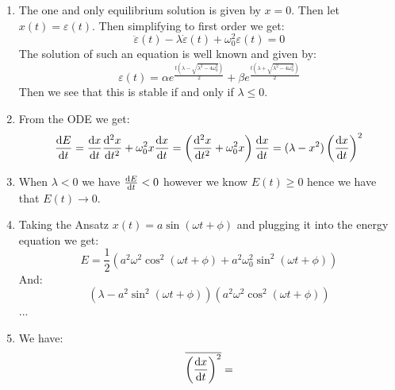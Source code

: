 \documentclass[10pt,a4paper]{book}
\begin{document}
\begin{enumerate}

\item The one and only equilibrium solution is given by $x = 0$. Then let $x(t) = \varepsilon(t)$. Then simplifying to first order we get:
\[
\ddot{\varepsilon}(t) - \lambda \dot{\varepsilon}(t) + \omega_0^2 \varepsilon(t) = 0 
\]
The solution of such an equation is well known and given by:
\[
\varepsilon(t) = \alpha e^{\frac{t(\lambda - \sqrt{\lambda^2 - 4 \omega_0^2})}{2}} + \beta e^{\frac{t(\lambda + \sqrt{\lambda^2 - 4 \omega_0^2})}{2}}
\]
Then we see that this is stable if and only if $\lambda \leq 0$. 

\item From the ODE we get:
\[
\dv{E}{t} = \dv{x}{t} \dv[2]{x}{t} + \omega_0^2 x \dv{x}{t} = \left( \dv[2]{x}{t} + \omega_0^2 x \right) \dv{x}{t} = (\lambda - x^2) \left(\dv{x}{t}\right)^2
\]

\item When $\lambda < 0$ we have $\dv{E}{t} < 0$ however we know $E(t) \geq 0$ hence we have that $E(t) \to 0$. 

\item Taking the Ansatz $x(t) = a \sin(\omega t + \phi)$ and plugging it into the energy equation we get:
\[
E = \frac{1}{2} \left( a^2 \omega^2 \cos^2(\omega t + \phi) + a^2 \omega_0^2 \sin^2(\omega t + \phi)  \right)
\]
And:
\[
(\lambda - a^2 \sin^2(\omega t + \phi)) (a^2 \omega^2 \cos^2(\omega t + \phi))
\]
...

\item We have:
\[
\overline{\left( \dv{x}{t} \right)^2} = 
\]


\end{enumerate}
\end{document}

